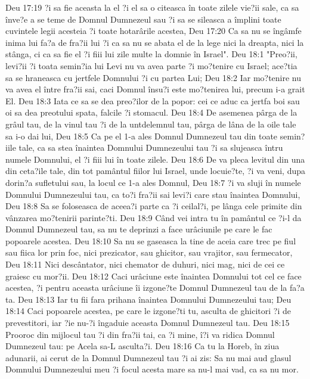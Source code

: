 Deu 17:19  ?i sa fie aceasta la el ?i el sa o citeasca în toate zilele vie?ii sale, ca sa înve?e a se teme de Domnul Dumnezeul sau ?i sa se sileasca a împlini toate cuvintele legii acesteia ?i toate hotarârile acestea,
Deu 17:20  Ca sa nu se îngâmfe inima lui fa?a de fra?ii lui ?i ca sa nu se abata el de la lege nici la dreapta, nici la stânga, ci ca sa fie el ?i fiii lui zile multe la domnie în Israel".
Deu 18:1  "Preo?ii, levi?ii ?i toata semin?ia lui Levi nu va avea parte ?i mo?tenire cu Israel; ace?tia sa se hraneasca cu jertfele Domnului ?i cu partea Lui;
Deu 18:2  Iar mo?tenire nu va avea el între fra?ii sai, caci Domnul însu?i este mo?tenirea lui, precum i-a grait El.
Deu 18:3  Iata ce sa se dea preo?ilor de la popor: cei ce aduc ca jertfa boi sau oi sa dea preotului spata, falcile ?i stomacul.
Deu 18:4  De asemenea pârga de la grâul tau, de la vinul tau ?i de la untdelemnul tau, pârga de lâna de la oile tale sa i-o dai lui,
Deu 18:5  Ca pe el 1-a ales Domnul Dumnezeul tau din toate semin?iile tale, ca sa stea înaintea Domnului Dumnezeului tau ?i sa slujeasca întru numele Domnului, el ?i fiii lui în toate zilele.
Deu 18:6  De va pleca levitul din una din ceta?ile tale, din tot pamântul fiilor lui Israel, unde locuie?te, ?i va veni, dupa dorin?a sufletului sau, la locul ce 1-a ales Domnul,
Deu 18:7  ?i va sluji în numele Domnului Dumnezeului tau, ca to?i fra?ii sai levi?i care stau înaintea Domnului,
Deu 18:8  Sa se foloseasca de aceea?i parte ca ?i ceilal?i, pe lânga cele primite din vânzarea mo?tenirii parinte?ti.
Deu 18:9  Când vei intra tu în pamântul ce ?i-l da Domnul Dumnezeul tau, sa nu te deprinzi a face urâciunile pe care le fac popoarele acestea.
Deu 18:10  Sa nu se gaseasca la tine de aceia care trec pe fiul sau fiica lor prin foc, nici prezicator, sau ghicitor, sau vrajitor, sau fermecator,
Deu 18:11  Nici descântator, nici chemator de duhuri, nici mag, nici de cei ce graiesc cu mor?ii.
Deu 18:12  Caci urâciune este înaintea Domnului tot cel ce face acestea, ?i pentru aceasta urâciune îi izgone?te Domnul Dumnezeul tau de la fa?a ta.
Deu 18:13  Iar tu fii fara prihana înaintea Domnului Dumnezeului tau;
Deu 18:14  Caci popoarele acestea, pe care le izgone?ti tu, asculta de ghicitori ?i de prevestitori, iar ?ie nu-?i îngaduie aceasta Domnul Dumnezeul tau.
Deu 18:15  Prooroc din mijlocul tau ?i din fra?ii tai, ca ?i mine, î?i va ridica Domnul Dumnezeul tau: pe Acela sa-L asculta?i.
Deu 18:16  Ca tu la Horeb, în ziua adunarii, ai cerut de la Domnul Dumnezeul tau ?i ai zis: Sa nu mai aud glasul Domnului Dumnezeului meu ?i focul acesta mare sa nu-l mai vad, ca sa nu mor.
